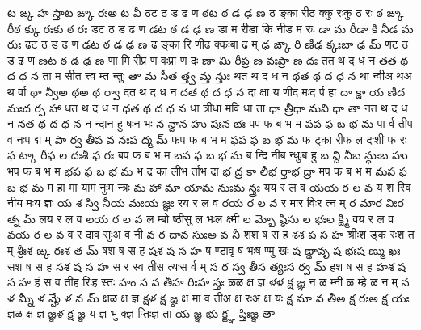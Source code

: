 \documentclass{article}
\begin{document}
{{ట ఙ్క హ స్తా}{ట ఙ్కా రః}{అ ట వీ}}
\card
{ठ}{ट ठ ड ढ ण}%
{ఠ}{ట ఠ డ ఢ ణ}
{{ठ ङ्का री}{ठ क्कु रः}{कु ठ रः}}%
{{ఠ ఙ్కా రీ}{ఠ క్కు రః}{కు ఠ రః}}
\card
{ड}{ट ठ ड ढ ण}%
{డ}{ట ఠ డ ఢ ణ}
{{डा म री}{डा कि नी}{ड म रुः}}%
{{డా మ రీ}{డా కి నీ}{డ మ రుః}}
\card
{ढ}{ट ठ ड ढ ण}%
{ఢ}{ట ఠ డ ఢ ణ}
{{ढ ङ्का रि णी}{ढ क्कः}{बा ढ म्}}%
{{ఢ ఙ్కా రి ణీ}{ఢ క్కః}{బా ఢ మ్}}
\card
{ण}{ट ठ ड ढ ण}%
{ణ}{ట ఠ డ ఢ ణ}
{{णा मि री}{प्र ण वः}{प्रा ण दः}}%
{{ణా మి రీ}{ప్ర ణ వః}{ప్రా ణ దః}}
\card
{त}{त थ द ध न}%
{త}{త థ ద ధ న}
{{ता म सी}{त त्त्व म्}{त न्तुः}}%
{{తా మ సీ}{త త్త్వ మ్}{త న్తుః}}
\card
{थ}{त थ द ध न}%
{థ}{త థ ద ధ న}
{{था न्वी}{अ थ}{अ थ र्वा}}%
{{థా న్వీ}{అ థ}{అ థ ర్వా}}
\card
{द}{त थ द ध न}%
{ద}{త థ ద ధ న}
{{दा क्षा य णी}{द मः}{द र्प हा}}%
{{దా క్షా య ణీ}{ద మః}{ద ర్ప హా}}
\card
{ध}{त थ द ध न}%
{ధ}{త థ ద ధ న}
{{धा त्री}{धा म}{वि धा ता}}%
{{ధా త్రీ}{ధా మ}{వి ధా తా}}
\card
{न}{त थ द ध न}%
{న}{త థ ద ధ న}
{{न न्दा}{न हु षः}{न भः}}%
{{న న్దా}{న హు షః}{న భః}}
\card
{प}{प फ ब भ म}%
{ప}{ప ఫ బ భ మ}
{{पा र्व ती}{प व नः}{प द्म म्}}%
{{పా ర్వ తీ}{ప వ నః}{ప ద్మ మ్}}
\card
{फ}{प फ ब भ म}%
{ఫ}{ప ఫ బ భ మ}
{{फ ट्का री}{फ ल दः}{शी फ रः}}%
{{ఫ ట్కా రీ}{ఫ ల దః}{శీ ఫ రః}}
\card
{ब}{प फ ब भ म}%
{బ}{ప ఫ బ భ మ}
{{ब न्दि नी}{ब न्धुः}{ब हु}}%
{{బ న్ది నీ}{బ న్ధుః}{బ హు}}
\card
{भ}{प फ ब भ म}%
{భ}{ప ఫ బ భ మ}
{{भ द्र का ली}{भ र्ता}{भ द्रा}}%
{{భ ద్ర కా లీ}{భ ర్తా}{భ ద్రా}}
\card
{म}{प फ ब भ म}%
{మ}{ప ఫ బ భ మ}
{{म हा मा या}{म नुः}{म न्त्रः}}%
{{మ హా మా యా}{మ నుః}{మ న్త్రః}}
\card
{य}{य र ल व}%
{య}{య ర ల వ}
{{य श स्वि नी}{य मः}{य ज्ञः}}%
{{య శ స్వి నీ}{య మః}{య జ్ఞః}}
\card
{र}{य र ल व}%
{ర}{య ర ల వ}
{{र मा}{र विः}{र त्न म्}}%
{{ర మా}{ర విః}{ర త్న మ్}}
\card
{ल}{य र ल व}%
{ల}{య ర ల వ}
{{ल म्बो ष्ठी}{सु ल भः}{ल क्ष्मी}}%
{{ల మ్బో ష్ఠీ}{సు ల భః}{ల క్ష్మీ}}
\card
{व}{य र ल व}%
{వ}{య ర ల వ}
{{व र दा}{व सुः}{अ व नी}}%
{{వ ర దా}{వ సుః}{అ వ నీ}}
\card
{श}{श ष स ह}%
{శ}{శ ష స హ}
{{श्रीः}{श ङ्क रः}{श त म्}}%
{{శ్రీః}{శ ఙ్క రః}{శ త మ్}}
\card
{ष}{श ष स ह}%
{ష}{శ ష స హ}
{{ष ण्डा}{वृ ष भः}{ष ण्मु खः}}%
{{ష ణ్డా}{వృ ష భః}{ష ణ్ము ఖః}}
\card
{स}{श ष स ह}%
{స}{శ ష స హ}
{{स र स्व ती}{स त्यः}{स र्व म्}}%
{{స ర స్వ తీ}{స త్యః}{స ర్వ మ్}}
\card
{ह}{श ष स ह}%
{హ}{శ ష స హ}
{{हं स व ती}{ह रिः}{ह स्तः}}%
{{హం స వ తీ}{హ రిః}{హ స్తః}}
\card
{ळ}{ळ क्ष ज्ञ}%
{ళ}{ళ క్ష జ్ఞ}
{{न ळ म्}{नी ळ म्}{हे ळ न म्}}%
{{న ళ మ్}{నీ ళ మ్}{హే ళ న మ్}}
\card
{क्ष}{ळ क्ष ज्ञ}%
{క్ష}{ళ క్ష జ్ఞ}
{{क्ष मा व ती}{अ क्ष रः}{अ क्ष यः}}%
{{క్ష మా వ తీ}{అ క్ష రః}{అ క్ష యః}}
\card
{ज्ञ}{ळ क्ष ज्ञ}%
{జ్ఞ}{ళ క్ష జ్ఞ}
{{य ज्ञ भु क्}{ज्ञ प्तिः}{ज्ञ ता}}%
{{య జ్ఞ భు క్}{జ్ఞ ప్తిః}{జ్ఞ తా}}
\end{document}
